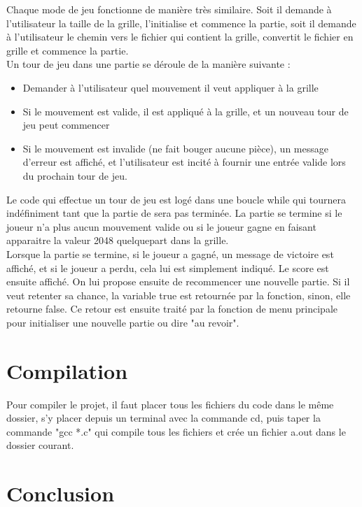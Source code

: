 \documentclass[12pt]{article}
\begin{document}
\indent Chaque mode de jeu fonctionne de manière très similaire. Soit il demande à l'utilisateur la taille de la grille, l'initialise et commence la partie, soit il demande à l'utilisateur le chemin vers le fichier qui contient la grille, convertit le fichier en grille et commence la partie.\\
Un tour de jeu dans une partie  se déroule de la manière suivante : \\
\begin{itemize}
    \item Demander à l'utilisateur quel mouvement il veut appliquer à la grille
    \item Si le mouvement est valide, il est appliqué à la grille, et un nouveau tour de jeu peut commencer
    \item Si le mouvement est invalide (ne fait bouger aucune pièce), un message d'erreur est affiché, et l'utilisateur est incité à fournir une entrée valide lors du prochain tour de jeu.
\end{itemize}
Le code qui effectue un tour de jeu est logé dans une boucle while qui tournera indéfiniment tant que la partie de sera pas terminée. La partie se termine si le joueur n'a plus aucun mouvement valide ou si le joueur gagne en faisant apparaitre la valeur 2048 quelquepart dans la grille.\\
Lorsque la partie se termine, si le joueur a gagné, un message de victoire est affiché, et si le joueur a perdu, cela lui est simplement indiqué. Le score est ensuite affiché. On lui propose ensuite de recommencer une nouvelle partie. Si il veut retenter sa chance, la variable true est retournée par la fonction, sinon, elle retourne false. Ce retour est ensuite traité par la fonction de menu principale pour initialiser une nouvelle partie ou dire "au revoir".

\section{Compilation}

\indent Pour compiler le projet, il faut placer tous les fichiers du code dans le même dossier, s'y placer depuis un terminal avec la commande cd, puis taper la commande "gcc *.c" qui compile tous les fichiers et crée un fichier a.out dans le dossier courant.

\section{Conclusion}
\end{document}
